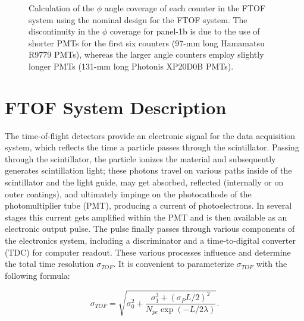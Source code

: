 \begin{figure}[htbp]
\vspace{9.0cm}
\caption{\small{Calculation of the $\phi$ angle coverage of each counter
in the FTOF system using the nominal design for the FTOF system.  The
discontinuity in the $\phi$ coverage for panel-1b is due to the use of
shorter PMTs for the first six counters (97-mm long Hamamatsu R9779 PMTs), 
whereas the larger angle counters employ slightly longer PMTs (131-mm long 
Photonis XP20D0B PMTs).}}
\label{phi_cov}
\end{figure}

\section{FTOF System Description}

The time-of-flight detectors provide an electronic signal for the data 
acquisition system, which reflects the time a particle passes through the 
scintillator.  Passing through the scintillator, the particle ionizes the 
material and subsequently generates scintillation light; these photons travel 
on various paths inside of the scintillator and the light guide, may 
get absorbed, reflected (internally or on outer coatings), and ultimately 
impinge on the photocathode of the photomultiplier tube (PMT), producing a 
current of photoelectrons.  In several stages this current gets amplified 
within the PMT and is then available as an electronic output pulse.  The 
pulse finally passes through various components of the electronics system, 
including a discriminator and a time-to-digital converter (TDC) for computer 
readout.  These various processes influence and determine the total time 
resolution $\sigma_{TOF}$.  It is convenient to parameterize $\sigma_{TOF}$ 
with the following formula:

\begin{equation}
\sigma_{TOF} = \sqrt{\sigma_0^2 + \frac{\sigma_1^2 + (\sigma_P L/2)^2}
{N_{pe}\exp(-L/2 \lambda)}}.
\end{equation}

